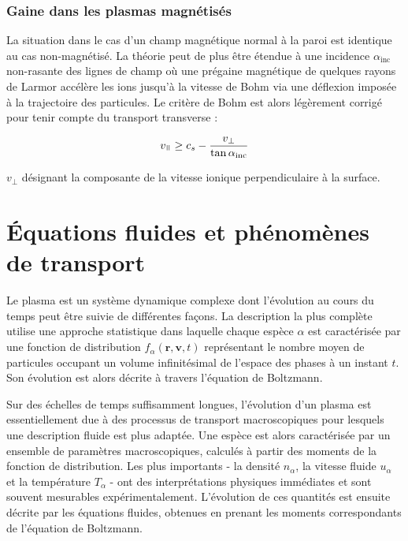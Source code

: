 \begin{refsection}



\subsubsection{Gaine dans les plasmas magnétisés}
La situation dans le cas d'un champ magnétique normal à la paroi est
identique au cas non-magnétisé. La théorie peut de plus être étendue 
à une incidence $\alpha_\text{inc}$ non-rasante des lignes de champ où une
prégaine magnétique de quelques rayons de Larmor accélère les ions jusqu'à la
vitesse de Bohm via une déflexion imposée à la trajectoire des particules. Le
critère de Bohm est alors légèrement corrigé pour tenir compte du transport transverse
\cite{Stangeby} :

\begin{equation}
	v_\para\geq
	c_{s}-\frac{v_\perp}{\tan{\alpha_\text{inc}}}
\end{equation}
 
 $v_\perp$ désignant la composante de la vitesse ionique perpendiculaire à la
 surface. 
 
 

\section{Équations fluides et phénomènes de transport}
\label{Maxwell-Boltzmann}

Le plasma est un système dynamique complexe dont l'évolution au cours du temps
peut être suivie de différentes façons. La description la plus complète utilise
une approche statistique dans laquelle chaque espèce $\alpha$ est caractérisée
par une fonction de distribution $f_\alpha(\mathbf{r},\mathbf{v},t)$
représentant le nombre moyen de particules occupant un volume infinitésimal
de l'espace des phases à un instant $t$. Son évolution est alors décrite à
travers l'équation de Boltzmann.

Sur des échelles de temps suffisamment longues, l'évolution d'un plasma est 
essentiellement due à des processus de transport macroscopiques pour lesquels
une description fluide est plus adaptée. Une espèce est alors
caractérisée par un ensemble de paramètres macroscopiques, calculés à
partir des moments de la fonction de distribution. Les plus importants -
la densité $n_\alpha$, la vitesse fluide $u_\alpha$ et la température $T_\alpha$
- ont des interprétations physiques immédiates et sont souvent mesurables
expérimentalement. L'évolution de ces quantités est ensuite décrite par les
équations fluides, obtenues en prenant les moments correspondants de l'équation de Boltzmann.



\end{refsection}
